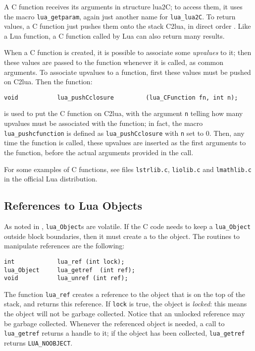 A C function receives its arguments in structure lua2C;
to access them, it uses the macro \verb|lua_getparam|, 
again just another name for \verb|lua_lua2C|.
To return values, a C function just pushes them onto the stack C2lua,
in direct order .
Like a Lua function, a C function called by Lua can also return
many results.

When a C function is created,
it is possible to associate some \emph{upvalues} to it;
then these values are passed to the function whenever it is called,
as common arguments.
To associate upvalues to a function,
first these values must be pushed on C2lua.
Then the function:
\begin{verbatim}
void           lua_pushCclosure         (lua_CFunction fn, int n);
\end{verbatim}
is used to put the C function on C2lua,
with the argument \verb|n| telling how many upvalues must be
associated with the function;
in fact, the macro \verb|lua_pushcfunction| is defined as
\verb|lua_pushCclosure| with \verb|n| set to 0.
Then, any time the function is called,
these upvalues are inserted as the first arguments to the function,
before the actual arguments provided in the call.

For some examples of C functions, see files \verb|lstrlib.c|,
\verb|liolib.c| and \verb|lmathlib.c| in the official Lua distribution.

\subsection{References to Lua Objects}

As noted in , \verb|lua_Object|s are volatile.
If the C code needs to keep a \verb|lua_Object|
outside block boundaries,
then it must create a  to the object.
The routines to manipulate references are the following:
\begin{verbatim}
int            lua_ref (int lock);
lua_Object     lua_getref  (int ref);
void           lua_unref (int ref);
\end{verbatim}
The function \verb|lua_ref| creates a reference
to the object that is on the top of the stack,
and returns this reference.
If \verb|lock| is true, the object is \emph{locked}:
this means the object will not be garbage collected.
Notice that an unlocked reference may be garbage collected.
Whenever the referenced object is needed,
a call to \verb|lua_getref|
returns a handle to it;
if the object has been collected,
\verb|lua_getref| returns \verb|LUA_NOOBJECT|.


